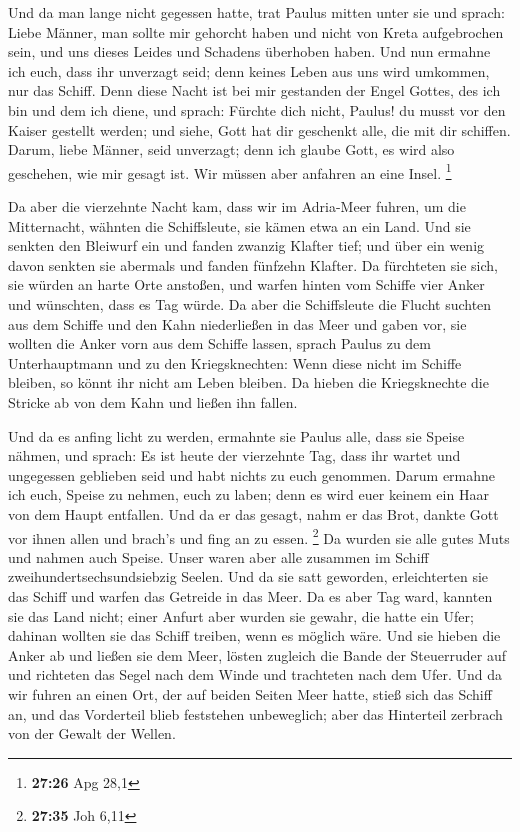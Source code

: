  Und da man lange nicht gegessen hatte, trat Paulus
mitten unter sie und sprach: Liebe Männer, man sollte mir gehorcht haben
und nicht von Kreta aufgebrochen sein, und uns dieses Leides und
Schadens überhoben haben.  Und nun ermahne ich euch, dass
ihr unverzagt seid; denn keines Leben aus uns wird umkommen, nur das
Schiff.  Denn diese Nacht ist bei mir gestanden der Engel
Gottes, des ich bin und dem ich diene,  und sprach:
Fürchte dich nicht, Paulus! du musst vor den Kaiser gestellt werden; und
siehe, Gott hat dir geschenkt alle, die mit dir schiffen.
 Darum, liebe Männer, seid unverzagt; denn ich glaube
Gott, es wird also geschehen, wie mir gesagt ist.  Wir
müssen aber anfahren an eine Insel. \footnote{\textbf{27:26} Apg 28,1}

 Da aber die vierzehnte Nacht kam, dass wir im Adria-Meer
fuhren, um die Mitternacht, wähnten die Schiffsleute, sie kämen etwa an
ein Land.  Und sie senkten den Bleiwurf ein und fanden
zwanzig Klafter tief; und über ein wenig davon senkten sie abermals und
fanden fünfzehn Klafter.  Da fürchteten sie sich, sie
würden an harte Orte anstoßen, und warfen hinten vom Schiffe vier Anker
und wünschten, dass es Tag würde.  Da aber die
Schiffsleute die Flucht suchten aus dem Schiffe und den Kahn
niederließen in das Meer und gaben vor, sie wollten die Anker vorn aus
dem Schiffe lassen,  sprach Paulus zu dem Unterhauptmann
und zu den Kriegsknechten: Wenn diese nicht im Schiffe bleiben, so könnt
ihr nicht am Leben bleiben.  Da hieben die Kriegsknechte
die Stricke ab von dem Kahn und ließen ihn fallen.

 Und da es anfing licht zu werden, ermahnte sie Paulus
alle, dass sie Speise nähmen, und sprach: Es ist heute der vierzehnte
Tag, dass ihr wartet und ungegessen geblieben seid und habt nichts zu
euch genommen.  Darum ermahne ich euch, Speise zu nehmen,
euch zu laben; denn es wird euer keinem ein Haar von dem Haupt
entfallen.  Und da er das gesagt, nahm er das Brot,
dankte Gott vor ihnen allen und brach's und fing an zu essen.
\footnote{\textbf{27:35} Joh 6,11}  Da wurden sie alle
gutes Muts und nahmen auch Speise.  Unser waren aber alle
zusammen im Schiff zweihundertsechsundsiebzig Seelen. 
Und da sie satt geworden, erleichterten sie das Schiff und warfen das
Getreide in das Meer.  Da es aber Tag ward, kannten sie
das Land nicht; einer Anfurt aber wurden sie gewahr, die hatte ein Ufer;
dahinan wollten sie das Schiff treiben, wenn es möglich wäre.
 Und sie hieben die Anker ab und ließen sie dem Meer,
lösten zugleich die Bande der Steuerruder auf und richteten das Segel
nach dem Winde und trachteten nach dem Ufer.  Und da wir
fuhren an einen Ort, der auf beiden Seiten Meer hatte, stieß sich das
Schiff an, und das Vorderteil blieb feststehen unbeweglich; aber das
Hinterteil zerbrach von der Gewalt der Wellen.

